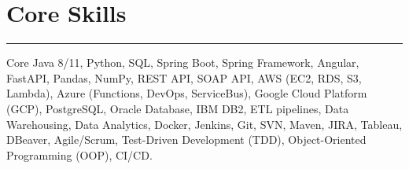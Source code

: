 \documentclass[letterpaper,11pt]{article}
\newcommand{\sectionline}{\vspace{2pt}\hrule\vspace{4pt}}
\begin{document}
\vspace{10pt}
\section*{Core Skills}
\sectionline
\small
Core Java 8/11, Python, SQL, Spring Boot, Spring Framework, Angular, FastAPI, Pandas, NumPy, REST API, SOAP API, AWS (EC2, RDS, S3, Lambda), Azure (Functions, DevOps, ServiceBus), Google Cloud Platform (GCP), PostgreSQL, Oracle Database, IBM DB2, ETL pipelines, Data Warehousing, Data Analytics, Docker, Jenkins, Git, SVN, Maven, JIRA, Tableau, DBeaver, Agile/Scrum, Test-Driven Development (TDD), Object-Oriented Programming (OOP), CI/CD.



\end{document}
